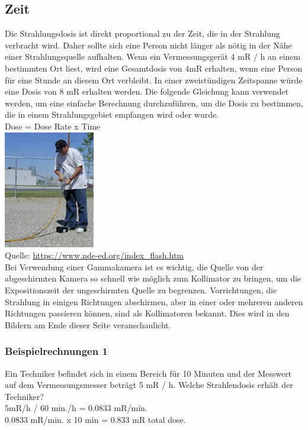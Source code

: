 \subsection{Zeit}
Die Strahlungsdosis ist direkt proportional zu der Zeit, die in der Strahlung verbracht wird. Daher sollte sich eine Person nicht länger als nötig in der Nähe einer Strahlungsquelle aufhalten. Wenn ein Vermessungsgerät 4 mR / h an einem bestimmten Ort liest, wird eine Gesamtdosis von 4mR erhalten, wenn eine Person für eine Stunde an diesem Ort verbleibt. In einer zweistündigen Zeitspanne würde eine Dosis von 8 mR erhalten werden. Die folgende Gleichung kann verwendet werden, um eine einfache Berechnung durchzuführen, um die Dosis zu bestimmen, die in einem Strahlungsgebiet empfangen wird oder wurde.\\
Dose = Dose Rate x Time \\
\includegraphics[scale=0.7]{img/timeDist.jpg}\\
Quelle: \url{https://www.nde-ed.org/index_flash.htm}\\
Bei Verwendung einer Gammakamera ist es wichtig, die Quelle von der abgeschirmten Kamera so schnell wie möglich zum Kollimator zu bringen, um die Expositionszeit der ungeschirmten Quelle zu begrenzen. Vorrichtungen, die Strahlung in einigen Richtungen abschirmen, aber in einer oder mehreren anderen Richtungen passieren können, sind als Kollimatoren bekannt. Dies wird in den Bildern am Ende dieser Seite veranschaulicht.
\subsubsection{Beispielrechnungen 1}
Ein Techniker befindet sich in einem Bereich für 10 Minuten und der Messwert auf dem Vermessungsmesser beträgt 5 mR / h. Welche Strahlendosis erhält der Techniker?\\
5mR/h / 60 min./h = 0.0833 mR/min.\\
0.0833 mR/min. x 10 min = 0.833 mR  total dose.\\

